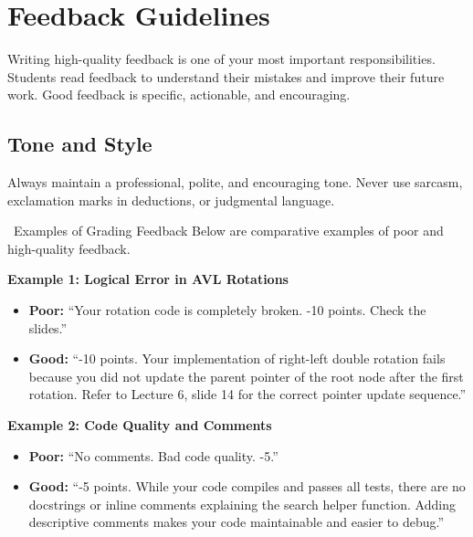 \section{Feedback Guidelines}
Writing high-quality feedback is one of your most important responsibilities. Students read feedback to understand their mistakes and improve their future work. Good feedback is specific, actionable, and encouraging.

\subsection{Tone and Style}
Always maintain a professional, polite, and encouraging tone. Never use sarcasm, exclamation marks in deductions, or judgmental language.

\begin{examplebox}{\faComments\ Examples of Grading Feedback}
    Below are comparative examples of poor and high-quality feedback.
    
    \vspace{0.8em}
    \noindent\textbf{Example 1: Logical Error in AVL Rotations}
    \begin{itemize}
        \item[\color{badred}\faTimes] \textbf{Poor:} ``Your rotation code is completely broken. -10 points. Check the slides.''
        \item[\color{goodgreen}\faCheck] \textbf{Good:} ``-10 points. Your implementation of right-left double rotation fails because you did not update the parent pointer of the root node after the first rotation. Refer to Lecture 6, slide 14 for the correct pointer update sequence.''
    \end{itemize}
    
    \vspace{0.8em}
    \noindent\textbf{Example 2: Code Quality and Comments}
    \begin{itemize}
        \item[\color{badred}\faTimes] \textbf{Poor:} ``No comments. Bad code quality. -5.''
        \item[\color{goodgreen}\faCheck] \textbf{Good:} ``-5 points. While your code compiles and passes all tests, there are no docstrings or inline comments explaining the search helper function. Adding descriptive comments makes your code maintainable and easier to debug.''
    \end{itemize}
\end{examplebox}

